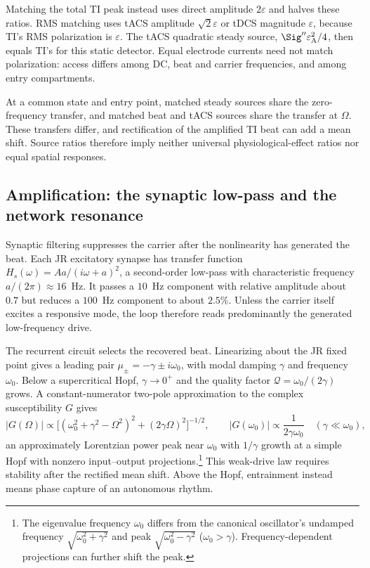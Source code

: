 Matching the total TI peak instead uses direct amplitude $2\varepsilon$
and halves these ratios. RMS matching uses tACS amplitude
$\sqrt2\varepsilon$ or tDCS magnitude $\varepsilon$, because TI's RMS
polarization is $\varepsilon$. The tACS quadratic steady source,
$\Sig''\varepsilon_{\rm A}^2/4$, then equals TI's for this static detector.
Equal electrode currents need not match polarization: access differs among
DC, beat and carrier frequencies, and among entry compartments.

At a common state and entry point, matched steady sources share the
zero-frequency transfer, and matched beat and tACS sources share the transfer
at $\Omega$. These transfers differ, and rectification of the amplified TI
beat can add a mean shift.
Source ratios therefore imply neither universal physiological-effect ratios
nor equal spatial responses.

\subsection{Amplification: the synaptic low-pass and the network resonance}\label{sec:carrier}
Synaptic filtering suppresses the carrier after the nonlinearity has generated
the beat. Each JR excitatory synapse has transfer function
$H_s(\omega)=Aa/(i\omega+a)^2$, a second-order low-pass with characteristic
frequency $a/(2\pi)\approx16$~Hz. It passes a $10$~Hz component with relative
amplitude about $0.7$ but reduces a $100$~Hz component to about $2.5\%$. Unless the
carrier itself excites a responsive mode, the loop therefore reads predominantly the
generated low-frequency drive.


The recurrent circuit selects the recovered beat. Linearizing about the JR
fixed point gives a leading pair $\mu_\pm=-\gamma\pm i\omega_0$, with
modal damping $\gamma$ and frequency $\omega_0$. Below a supercritical
Hopf, $\gamma\to0^+$ and the quality factor
$\mathcal Q=\omega_0/(2\gamma)$ grows. A constant-numerator two-pole
approximation to the complex susceptibility $G$ gives
\begin{equation}
|G(\Omega)|\propto\big[(\omega_0^2+\gamma^2-\Omega^2)^2+(2\gamma\Omega)^2\big]^{-1/2},
\qquad |G(\omega_0)|\propto\frac{1}{2\gamma\omega_0}
\quad(\gamma\ll\omega_0),
\label{eq:gain}
\end{equation}
an approximately Lorentzian power peak near $\omega_0$ with $1/\gamma$
growth at a simple Hopf with nonzero input--output projections.\footnote{
The eigenvalue frequency $\omega_0$ differs from the canonical oscillator's
undamped frequency $\sqrt{\omega_0^2+\gamma^2}$ and peak
$\sqrt{\omega_0^2-\gamma^2}$ ($\omega_0>\gamma$).
Frequency-dependent projections can further shift the peak.}
This weak-drive law requires stability after the rectified mean shift.
Above the Hopf, entrainment instead means phase capture of an autonomous rhythm.

